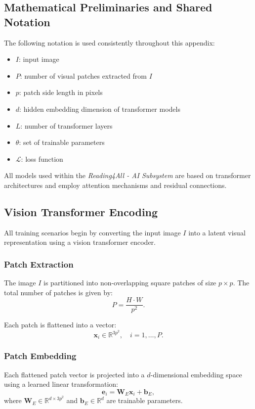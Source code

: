 \documentclass[12pt, titlepage]{article}
\begin{document}
\subsection{Mathematical Preliminaries and Shared Notation}

The following notation is used consistently throughout this appendix:

\begin{itemize}
    \item $I$: input image
    \item $P$: number of visual patches extracted from $I$
    \item $p$: patch side length in pixels
    \item $d$: hidden embedding dimension of transformer models
    \item $L$: number of transformer layers
    \item $\theta$: set of trainable parameters
    \item $\mathcal{L}$: loss function
\end{itemize}

All models used within the \textit{Reading4All - AI Subsystem} are based on transformer
architectures and employ attention mechanisms and residual connections.

\subsection{Vision Transformer Encoding}

All training scenarios begin by converting the input image $I$ into a latent
visual representation using a vision transformer encoder.

\subsubsection{Patch Extraction}

The image $I$ is partitioned into non-overlapping square patches of size
$p \times p$. The total number of patches is given by:
\[
P = \frac{H \cdot W}{p^2}.
\]

Each patch is flattened into a vector:
\[
\mathbf{x}_i \in \mathbb{R}^{3p^2}, \quad i = 1,\dots,P.
\]

\subsubsection{Patch Embedding}

Each flattened patch vector is projected into a $d$-dimensional embedding space
using a learned linear transformation:
\[
\mathbf{e}_i = \mathbf{W}_E \mathbf{x}_i + \mathbf{b}_E,
\]
where $\mathbf{W}_E \in \mathbb{R}^{d \times 3p^2}$ and
$\mathbf{b}_E \in \mathbb{R}^d$ are trainable parameters.
\end{document}
